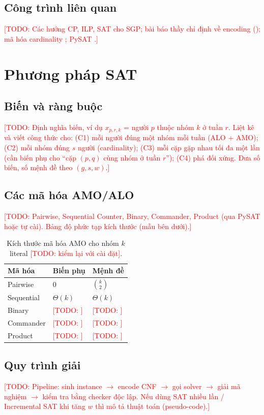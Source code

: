 \documentclass[a4paper,fleqn]{cas-sc}
\newcommand{\TODO}[1]{\textcolor{red}{[TODO: #1]}}
\begin{document}
\subsection{Công trình liên quan}
\TODO{Các hướng CP, ILP, SAT cho SGP; bài báo thầy chỉ định về encoding
(\cite{csplib-sgp}); mã hóa cardinality \cite{sinz2005,prestwich2009}; PySAT
\cite{pysat-paper}.}

\section{Phương pháp SAT}
\subsection{Biến và ràng buộc}
\TODO{Định nghĩa biến, ví dụ $x_{p,r,k}$ = người $p$ thuộc nhóm $k$ ở tuần $r$.
Liệt kê và viết công thức cho: (C1) mỗi người đúng một nhóm mỗi tuần (ALO + AMO);
(C2) mỗi nhóm đúng $s$ người (cardinality); (C3) mỗi cặp gặp nhau tối đa một lần
(cần biến phụ cho ``cặp $(p,q)$ cùng nhóm ở tuần $r$''); (C4) phá đối xứng. Đưa
số biến, số mệnh đề theo $(g,s,w)$.}

\subsection{Các mã hóa AMO/ALO}
\TODO{Pairwise, Sequential Counter, Binary, Commander, Product (qua PySAT hoặc tự
cài). Bảng độ phức tạp kích thước (mẫu bên dưới).}

\begin{table}[htbp]
  \centering
  \caption{Kích thước mã hóa AMO cho nhóm $k$ literal \TODO{kiểm lại với cài đặt}.}
  \label{tab:amo}
  \begin{tabular}{lll}
    \toprule
    Mã hóa & Biến phụ & Mệnh đề \\
    \midrule
    Pairwise   & $0$ & $\binom{k}{2}$ \\
    Sequential & $\Theta(k)$ & $\Theta(k)$ \\
    Binary     & \TODO{} & \TODO{} \\
    Commander  & \TODO{} & \TODO{} \\
    Product    & \TODO{} & \TODO{} \\
    \bottomrule
  \end{tabular}
\end{table}

\subsection{Quy trình giải}
\TODO{Pipeline: sinh instance $\rightarrow$ encode CNF $\rightarrow$ gọi solver
$\rightarrow$ giải mã nghiệm $\rightarrow$ kiểm tra bằng checker độc lập. Nếu dùng
SAT nhiều lần / Incremental SAT khi tăng $w$ thì mô tả thuật toán (pseudo-code).}
\end{document}
